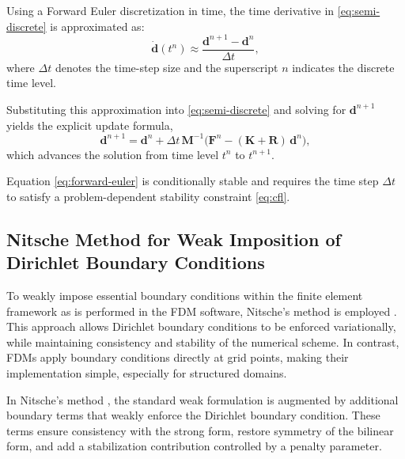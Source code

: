 \documentclass[conference]{IEEEtran}
\begin{document}
Using a Forward Euler discretization in time, the time derivative in
\eqref{eq:semi-discrete} is approximated as:
\[
\dot{\mathbf{d}}(t^n)
\approx
\frac{\mathbf{d}^{n+1} - \mathbf{d}^n}{\Delta t},
\]
where $\Delta t$ denotes the time-step size and the superscript $n$ indicates
the discrete time level.

Substituting this approximation into \eqref{eq:semi-discrete} and solving for
$\mathbf{d}^{n+1}$ yields the explicit update formula,
\begin{equation}
\mathbf{d}^{n+1}
=
\mathbf{d}^n
+
\Delta t \, \mathbf{M}^{-1}
\big(
\mathbf{F}^n
-
(\mathbf{K} + \mathbf{R})\, \mathbf{d}^n
\big),
\label{eq:forward-euler}
\end{equation}
which advances the solution from time level $t^n$ to $t^{n+1}$.

Equation \eqref{eq:forward-euler} is conditionally stable and requires the time
step $\Delta t$ to satisfy a problem-dependent stability constraint \eqref{eq:cfl}.


\subsection{Nitsche Method for Weak Imposition of Dirichlet Boundary Conditions}

To weakly impose essential boundary conditions within the finite element
framework as is performed in the FDM software, Nitsche’s method is employed \cite{b16}. This approach allows Dirichlet boundary conditions to be enforced variationally, while maintaining consistency and stability of the numerical scheme. In contrast, FDMs apply boundary conditions directly at grid points, making their implementation simple, especially for structured domains.

In Nitsche’s method \cite{b16}, the standard weak formulation is augmented by additional boundary terms that weakly enforce the Dirichlet boundary condition. These terms ensure consistency with the strong form, restore symmetry of the bilinear form, and add a stabilization contribution controlled by a penalty parameter.
\end{document}

